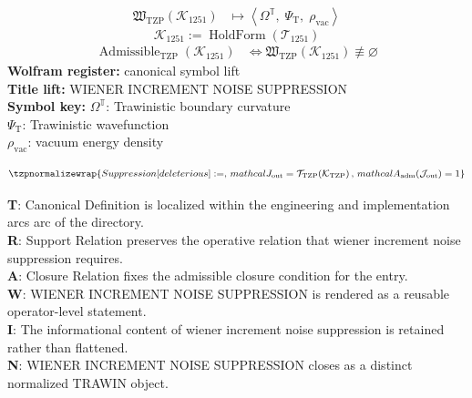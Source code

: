 \noindent
\begin{minipage}[t]{0.48\linewidth}
\begingroup
\small
\[
\begin{aligned}
\mathfrak{W}_{\mathrm{TZP}}\!\left(\mathcal{K}_{1251}\right)
&\longmapsto
\left\langle \Omega^{\mathbb{T}},\; \Psi_{\mathrm{T}},\; \rho_{\mathrm{vac}} \right\rangle
\end{aligned}
\]
\[
\mathcal{K}_{1251}
:=
\operatorname{HoldForm}\!\left(\mathcal{T}_{1251}\right)
\]
\[
\begin{aligned}
\operatorname{Admissible}_{\mathrm{TZP}}\!\left(\mathcal{K}_{1251}\right)
&\Longleftrightarrow
\mathfrak{W}_{\mathrm{TZP}}\!\left(\mathcal{K}_{1251}\right)\not\equiv\varnothing
\end{aligned}
\]
\textbf{Wolfram register:} canonical symbol lift\\
\textbf{Title lift:} WIENER INCREMENT NOISE SUPPRESSION\\
\textbf{Symbol key:} \(\Omega^{\mathbb{T}}\): Trawinistic boundary curvature\\ \(\Psi_{\mathrm{T}}\): Trawinistic wavefunction\\ \(\rho_{\mathrm{vac}}\): vacuum energy density
\par
\endgroup
\end{minipage}\hfill
\begin{minipage}[t]{0.48\linewidth}
\[
\tzpnormalizewrap{Suppression[deleterious] :=,\,mathcal{J}_{\mathrm{out}} = \mathcal{T}_{\mathrm{TZP}}\!\left(\mathcal{K}_{\mathrm{TZP}}\right),\,mathcal{A}_{\mathrm{adm}}\!\left(\mathcal{J}_{\mathrm{out}}\right)=1}
\]

\small
\textbf{T}: Canonical Definition is localized within the engineering and implementation arcs arc of the directory.\\
\textbf{R}: Support Relation preserves the operative relation that wiener increment noise suppression requires.\\
\textbf{A}: Closure Relation fixes the admissible closure condition for the entry.\\
\textbf{W}: WIENER INCREMENT NOISE SUPPRESSION is rendered as a reusable operator-level statement.\\
\textbf{I}: The informational content of wiener increment noise suppression is retained rather than flattened.\\
\textbf{N}: WIENER INCREMENT NOISE SUPPRESSION closes as a distinct normalized TRAWIN object.
\normalsize
\end{minipage}

